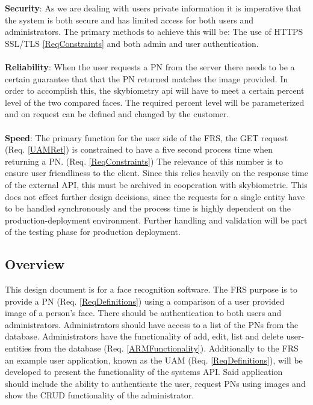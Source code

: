 \documentclass[a4paper,11pt]{article}
\begin{document}
\textbf{Security}: As we are dealing with users private information it is imperative that the system is both secure and has limited access for both users and administrators. The primary methods to achieve this will be: The use of HTTPS SSL/TLS \ref{ReqConstraints}  and both admin and user authentication. \\ \\
\noindent
\textbf{Reliability}: When the user requests a PN from the server there needs to be a certain guarantee that that the PN returned matches the image provided. In order to accomplish this, the skybiometry api will have to meet a certain percent level of the two compared faces. The required percent level will be parameterized and on request can be defined and changed by the customer. \\ \\
\noindent
\textbf{Speed}: The primary function for the user side of the FRS, the GET request (Req. \ref{UAMRet}) is constrained to have a five second process time when returning a PN. (Req. \ref{ReqConstraints}) The relevance of this number is to ensure user friendliness to the client.
Since this relies heavily on the response time of the external API, this must be archived in cooperation with skybiometric. This does not effect further design decisions, since the requests for a single entity have to be handled synchronously and the process time is highly dependent on the production-deployment environment. Further handling and validation will be part of the testing phase for production deployment. 
\subsection{Overview}
This design document is for a face recognition software. The FRS purpose is to provide a PN (Req. \ref{ReqDefinitions}) using a comparison of a user provided image of a person's face. There should  be authentication to both users and administrators. Administrators should have access to a list of the PNs from the database. Administrators have the functionality of add, edit, list and delete user-entities from the database (Req. \ref{ARMFunctionality}).
Additionally to the FRS an example user application, known as the UAM (Req. \ref{ReqDefinitions}), will be developed to present the functionality of the systems API. Said application should include the ability to authenticate the user, request PNs using images and show the CRUD functionality of the administrator.
\end{document}
